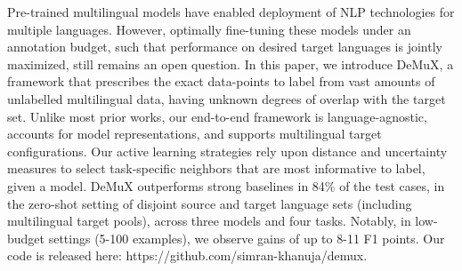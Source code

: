 Pre-trained multilingual models have enabled deployment of NLP technologies for multiple languages. However, optimally fine-tuning these models under an annotation budget, such that performance on desired target languages is jointly maximized, still remains an open question. In this paper, we introduce DeMuX, a framework that prescribes the exact data-points to label from vast amounts of unlabelled multilingual data, having unknown degrees of overlap with the target set. Unlike most prior works, our end-to-end framework is language-agnostic, accounts for model representations, and supports multilingual target configurations. Our active learning strategies rely upon distance and uncertainty measures to select task-specific neighbors that are most informative to label, given a model. DeMuX outperforms strong baselines in 84\% of the test cases, in the zero-shot setting of disjoint source and target language sets (including multilingual target pools), across three models and four tasks. Notably, in low-budget settings (5-100 examples), we observe gains of up to 8-11 F1 points. Our code is released here: https://github.com/simran-khanuja/demux.